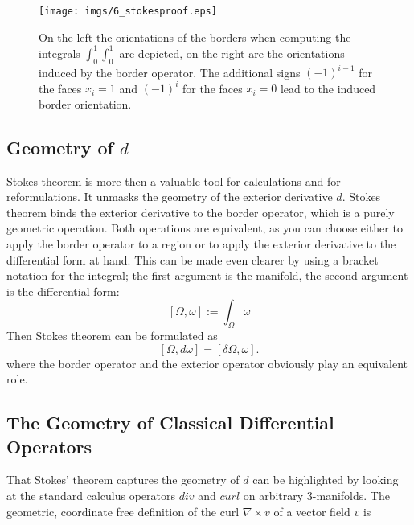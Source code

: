 \begin{figure}[t]%
\texttt{[image: imgs/6\_stokesproof.eps]}%
\caption{On the left the orientations of the borders when computing the integrals $\int_0^1\int_0^1$ are depicted, on the right are the orientations induced by the border operator. The additional signs $(-1)^{i-1}$ for the faces $x_i=1$ and $(-1)^{i}$ for the faces $x_i=0$ lead to the induced border orientation.}%
\label{fig:6_stokesproof}%
\end{figure}

\subsection{Geometry of $d$}

Stokes theorem is more then a  valuable tool for calculations and for reformulations. It unmasks the geometry of the exterior derivative $d$. Stokes theorem binds the exterior derivative to the border operator, which is a purely geometric operation. Both operations are equivalent, as you can choose either to apply the border operator to a region or to apply the exterior derivative to the differential form at hand.
This can be made even clearer by using a bracket notation for the integral; the first argument is the manifold, the second argument is the differential form:
\[[\Omega, \omega] := \int_{\Omega} \omega\]
Then Stokes theorem can be formulated as
\[[\Omega, d\omega] = [\delta \Omega, \omega].\]
where the border operator and the exterior operator obviously play an equivalent role.

\subsection{The Geometry of Classical Differential Operators}
\label{subsec:geometryCDO}
That Stokes' theorem captures the geometry of $d$ can be highlighted by looking at the standard calculus operators $div$ and $curl$ on arbitrary 3-manifolds.  The geometric, coordinate free definition of the curl $\nabla \times v$ of a vector field $v$ is 

